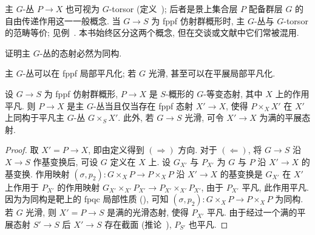 主 $G$-丛 $P\to X$ 也可视为 $G$-torsor (定义~); 后者是景上集合层 $P$ 配备群层 $G$ 的自由传递作用这一一般概念. 当 $G\to S$ 为 fppf 仿射群概形时, 主 $G$-丛与 $G$-torsor 的范畴等价; 见例~. 本书始终区分这两个概念, 但在交谈或文献中它们常被混用.
\begin{exercise}\label{src:B.1.51}
证明主 $G$-丛的态射必然为同构.
\end{exercise}
主 $G$-丛可以在 fppf 局部平凡化; 若 $G$ 光滑, 甚至可以在平展局部平凡化.
\begin{proposition}\label{src:B.1.52}
设 $G\to S$ 为 fppf 仿射群概形, $P\to X$ 是 $S$-概形的 $G$-等变态射, 其中 $X$ 上的作用平凡. 则 $P\to X$ 是主 $G$-丛当且仅当存在 fppf 态射 $X'\to X$, 使得 $P\times_X X'$ 在 $X'$ 上同构于平凡主 $G$-丛 $G\times_S X'$. 此外, 若 $G\to S$ 光滑, 可令 $X'\to X$ 为满的平展态射.
\end{proposition}
\begin{proof}
取 $X'=P\to X$, 即由定义得到 $(\Longrightarrow)$ 方向. 对于 $(\Longleftarrow)$, 将 $G\to S$ 沿 $X\to S$ 作基变换后, 可设 $G$ 定义在 $X$ 上. 设 $G_{X'}$ 与 $P_{X'}$ 为 $G$ 与 $P$ 沿 $X'\to X$ 的基变换. 作用映射 $(\sigma,p_2):G\times_X P\to P\times_X P$ 沿 $X'\to X$ 的基变换是 $G_{X'}$ 在 $X'$ 上作用于 $P_{X'}$ 的作用映射 $G_{X'}\times_{X'}P_{X'}\to P_{X'}\times_{X'}P_{X'}$, 由于 $P_{X'}$ 平凡, 此作用平凡. 因为为同构是靶上的 fpqc 局部性质 (), 可知 $(\sigma,p_2):G\times_X P\to P\times_X P$ 为同构. 若 $G$ 光滑, 则 $X'=P\to S$ 是满的光滑态射, 使得 $P_{X'}$ 平凡. 由于经过一个满的平展态射 $S'\to S$ 后 $X'\to S$ 存在截面 (推论~), $P_{S'}$ 也平凡.
\end{proof}

